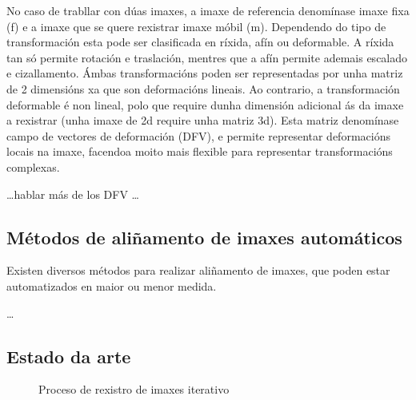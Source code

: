 No caso de trabllar con dúas imaxes, a imaxe de referencia denomínase imaxe fixa (f) e a imaxe que se quere rexistrar imaxe móbil (m).
Dependendo do tipo de transformación esta pode ser clasificada en ríxida, afín ou deformable.
A ríxida tan só permite rotación e traslación, mentres que a afín permite ademais escalado e cizallamento.
Ámbas transformacións poden ser representadas por unha matriz de 2 dimensións xa que son deformacións lineais.
Ao contrario, a transformación deformable é non lineal, polo que require dunha dimensión adicional ás da imaxe a rexistrar (unha imaxe de 2d require unha matriz 3d).
Esta matriz denomínase campo de vectores de deformación (DFV), e permite representar deformacións locais na imaxe, facendoa moito mais flexible para representar transformacións complexas.

\dots hablar más de los DFV \dots

\subsection{Métodos de aliñamento de imaxes automáticos}
\label{subsec:Métodos de aliñamento de imaxes automáticos}
Existen diversos métodos para realizar aliñamento de imaxes, que poden estar automatizados en maior ou menor medida.


\dots


\subsection{Estado da arte}
\label{subsec:Estado da arte}
\begin{figure}[hp!]
    \centering
\caption{Proceso de rexistro de imaxes iterativo}
\label{fig:rexistro_iterativo}
\end{figure}

